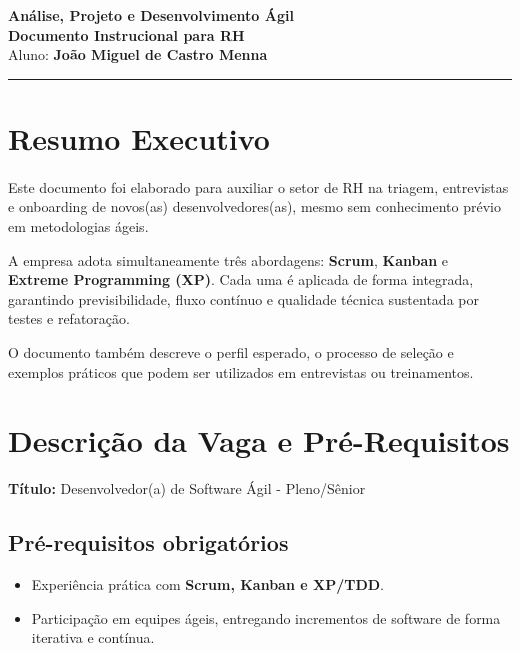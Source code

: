 \documentclass{article}
\begin{document}
\begin{center}
    \centering

    {\huge \textbf{Análise, Projeto e Desenvolvimento Ágil}}\\[0.5cm]

    {\Huge \textbf{Documento Instrucional para RH}}\\[0.5cm]

    {\large Aluno: \textbf{João Miguel de Castro Menna}}\\[0.5cm]
\end{center}

\vspace{1em}
\hrule
\vspace{1em}

\section{Resumo Executivo}

\paragraph{}

Este documento foi elaborado para auxiliar o setor de RH na triagem, entrevistas e onboarding de novos(as) desenvolvedores(as), mesmo sem conhecimento prévio em metodologias ágeis.

A empresa adota simultaneamente três abordagens: \textbf{Scrum}, \textbf{Kanban} e \textbf{Extreme Programming (XP)}. Cada uma é aplicada de forma integrada, garantindo previsibilidade, fluxo contínuo e qualidade técnica sustentada por testes e refatoração.

O documento também descreve o perfil esperado, o processo de seleção e exemplos práticos que podem ser utilizados em entrevistas ou treinamentos.

\section{Descrição da Vaga e Pré-Requisitos}

\textbf{Título:} Desenvolvedor(a) de Software Ágil - Pleno/Sênior

\subsection*{Pré-requisitos obrigatórios}
\begin{itemize}[noitemsep]
    \item Experiência prática com \textbf{Scrum, Kanban e XP/TDD}.
    \item Participação em equipes ágeis, entregando incrementos de software de forma iterativa e contínua.
\end{itemize}
\end{document}
